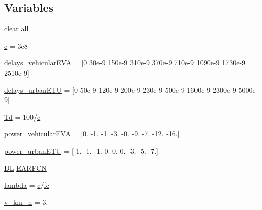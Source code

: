 \subsection*{Variables}
\begin{DoxyCompactItemize}
\item 
clear \hyperlink{mmwave_2model_2fading-traces_2fading__trace__generator_8m_a00a349297fa58bc80ff5329e25dcfe28}{all}
\item 
\hyperlink{mmwave_2model_2fading-traces_2fading__trace__generator_8m_ae0323a9039add2978bf5b49550572c7c}{c} = 3e8
\item 
\hyperlink{mmwave_2model_2fading-traces_2fading__trace__generator_8m_ab3d827b00d38729fe570d339e33d1f73}{delays\+\_\+vehicular\+E\+VA} = \mbox{[}0 30e-\/9 150e-\/9 310e-\/9 370e-\/9 710e-\/9 1090e-\/9 1730e-\/9 2510e-\/9\mbox{]}
\item 
\hyperlink{mmwave_2model_2fading-traces_2fading__trace__generator_8m_a2430f6739a38fc80fedbfa62769d2964}{delays\+\_\+urban\+E\+TU} = \mbox{[}0 50e-\/9 120e-\/9 200e-\/9 230e-\/9 500e-\/9 1600e-\/9 2300e-\/9 5000e-\/9\mbox{]}
\item 
\hyperlink{mmwave_2model_2fading-traces_2fading__trace__generator_8m_aea74bce2def3167f74eb7bbfc6796882}{Td} = 100/\hyperlink{mmwave_2model_2fading-traces_2fading__trace__generator_8m_ae0323a9039add2978bf5b49550572c7c}{c}
\item 
\hyperlink{mmwave_2model_2fading-traces_2fading__trace__generator_8m_a60909e41d7ca79f02db1849716d719b4}{power\+\_\+vehicular\+E\+VA} = \mbox{[}0. -\/1. -\/1. -\/3. -\/0. -\/9. -\/7. -\/12. -\/16.\mbox{]}
\item 
\hyperlink{mmwave_2model_2fading-traces_2fading__trace__generator_8m_a7ba5c705943c4503a79e8758121bff38}{power\+\_\+urban\+E\+TU} = \mbox{[}-\/1. -\/1. -\/1. 0. 0. 0. -\/3. -\/5. -\/7.\mbox{]}
\item 
\hyperlink{lte__uplink__power__control_8m_acbfa302723d9ea416f536a1ead7a5026}{DL} \hyperlink{mmwave_2model_2fading-traces_2fading__trace__generator_8m_aaf9d1de236e0d66a6386c33f6e66f766}{E\+A\+R\+F\+CN}
\item 
\hyperlink{mmwave_2model_2fading-traces_2fading__trace__generator_8m_aca36b09d6e71a60cfa3837d7e24c07ca}{lambda} = \hyperlink{mmwave_2model_2fading-traces_2fading__trace__generator_8m_ae0323a9039add2978bf5b49550572c7c}{c}/\hyperlink{lte__uplink__power__control_8m_a72d54db2b27ce046aab6e6a414c407e9}{fc}
\item 
\hyperlink{mmwave_2model_2fading-traces_2fading__trace__generator_8m_ae7f804d3a4530aaf512fd8c59271cfd2}{v\+\_\+km\+\_\+h} = 3.

\end{DoxyCompactItemize}

